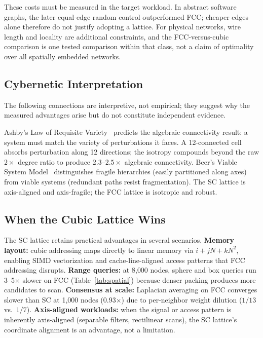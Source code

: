\documentclass[11pt]{article}
\begin{document}
These costs must be measured in the target workload. In abstract software
graphs, the later equal-edge random control outperformed FCC; cheaper
edges alone therefore do not justify adopting a lattice. For physical
networks, wire length and locality are additional constraints, and the
FCC-versus-cubic comparison is one tested comparison within that class,
not a claim of optimality over all spatially embedded networks.

\subsection{Cybernetic Interpretation}

The following connections are interpretive, not empirical; they
suggest why the measured advantages arise but do not constitute
independent evidence.

Ashby's Law of Requisite Variety~\cite{ashby1956} predicts the
algebraic connectivity result: a system must match the variety of
perturbations it faces. A 12-connected cell absorbs perturbation
along 12 directions; the isotropy compounds beyond the raw $2\times$
degree ratio to produce $2.3$--$2.5\times$ algebraic connectivity.
Beer's Viable System Model~\cite{beer1972} distinguishes fragile
hierarchies (easily partitioned along axes) from viable systems
(redundant paths resist fragmentation). The SC lattice is axis-aligned
and axis-fragile; the FCC lattice is isotropic and robust.

\subsection{When the Cubic Lattice Wins}

The SC lattice retains practical advantages in several scenarios.
\textbf{Memory layout:} cubic addressing maps directly to linear
memory via $i + jN + kN^2$, enabling SIMD vectorization and
cache-line-aligned access patterns that FCC addressing disrupts.
\textbf{Range queries:} at 8{,}000 nodes, sphere and box queries
run 3--5$\times$ slower on FCC (Table~\ref{tab:spatial}) because
denser packing produces more candidates to scan.
\textbf{Consensus at scale:} Laplacian averaging on FCC converges
slower than SC at 1{,}000 nodes (0.93$\times$) due to per-neighbor
weight dilution ($1/13$ vs.\ $1/7$).
\textbf{Axis-aligned workloads:} when the signal or access pattern
is inherently axis-aligned (separable filters, rectilinear scans),
the SC lattice's coordinate alignment is an advantage, not a
limitation.
\end{document}
